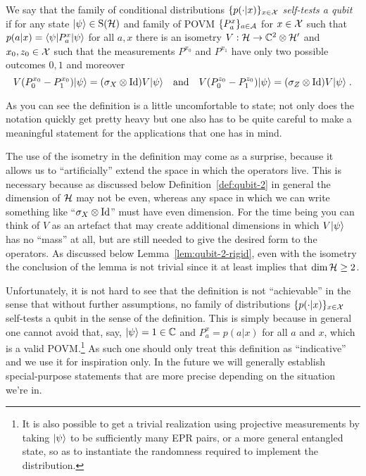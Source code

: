 \begin{definition}\label{def:self-test}
We say that the family of conditional distributions $\{p(\cdot|x)\}_{x\in \mathcal{X}}$ \emph{self-tests a qubit} if for any state $|\psi\rangle\in \mathrm{S}(\mathcal{H})$ and  family of POVM $\{ P^x_a \}_{a\in \mathcal{A}}$ for $x\in \mathcal{X}$ such that $p(a|x) = \langle\psi| P^x_a |\psi\rangle$ for all $a,x$ there is an isometry $V: \mathcal{H}\to \mathbb{C}^2 \otimes \mathcal{H}'$ and $x_0,z_0 \in \mathcal{X}$ such that the measurements $P^{x_0}$ and $P^{x_1}$ have only two possible outcomes $0,1$ and moreover
\begin{equation}\label{eq:st-1} V ( P^{x_0}_0 - P^{x_0}_1 ) |\psi\rangle = (\sigma_X \otimes \mathop{\rm Id}\nolimits )V |\psi\rangle\quad\text{and}\quad V ( P^{z_0}_0 - P^{z_0}_1 ) |\psi\rangle = (\sigma_Z \otimes \mathop{\rm Id}\nolimits )V |\psi\rangle \;.
\end{equation}
\end{definition}

As you can see the definition is a little uncomfortable to state; not only does the notation quickly get pretty heavy but one also has to be quite careful to make a meaningful statement for the applications that one has in mind.

The use of the isometry in the definition may come as a surprise, because it allows us to ``artificially'' extend the space in which the operators live. This is necessary because as discussed below Definition~\ref{def:qubit-2} in general the dimension of $\mathcal{H}$ may not be even, whereas any space in which we can write something like ``$\sigma_X\otimes \mathop{\rm Id}\nolimits$'' must have even dimension. For the time being you can think of $V$ as an artefact that may create additional dimensions in which $V|\psi\rangle$ has no ``mass'' at all, but are still needed to give the desired form to the operators. As discussed below Lemma~\ref{lem:qubit-2-rigid}, even with the isometry the conclusion of the lemma is not trivial since it at least implies that $\dim\mathcal{H}\geq 2$. 

Unfortunately, it is not hard to see that the definition is not ``achievable'' in the sense that without further assumptions, no family of distributions $\{p(\cdot|x)\}_{x\in \mathcal{X}}$ {self-tests a qubit} in the sense of the definition. This is simply because in general one cannot avoid that, say, $|\psi\rangle = 1 \in \mathbb{C}$ and $P^x_a = p(a|x)$ for all $a$ and $x$, which is a valid POVM.\footnote{It is also possible to get a trivial realization using projective measurements by taking $|\psi\rangle$ to be sufficiently many EPR pairs, or a more general entangled state, so as to instantiate the randomness required to implement the distribution.} As such one should only treat this definition as ``indicative'' and we use it for inspiration only. In the future we will generally establish special-purpose statements that are more precise depending on the situation we're in. 




